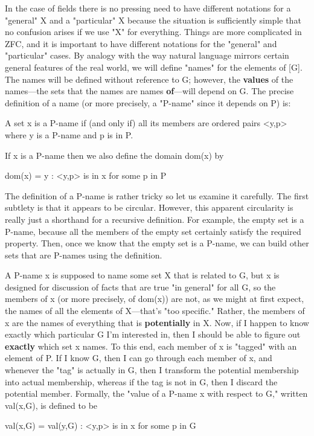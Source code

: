 \documentclass[10pt]{article}
\theoremstyle{definition}
\begin{document}
In the case of fields there is no pressing need to have different notations
for a "general" X and a "particular" X because the situation is sufficiently
simple that no confusion arises if we use "X" for everything.  Things are
more complicated in ZFC, and it is important to have different notations for
the "general" and "particular" cases.  By analogy with the way natural
language mirrors certain general features of the real world, we will define
"names" for the elements of [G].  The names will be defined without
reference to G; however, the \textbf{values} of the names---the sets that the names
are names \textbf{of}---will depend on G.  The precise definition of a name (or
more precisely, a "P-name" since it depends on P) is:

  A set x is a P-name if (and only if) all its members are
  ordered pairs <y,p> where y is a P-name and p is in P.

If x is a P-name then we also define the domain dom(x) by

  dom(x) = {y : <y,p> is in x for some p in P}

The definition of a P-name is rather tricky so let us examine it carefully.
The first subtlety is that it appears to be circular.  However, this
apparent circularity is really just a shorthand for a recursive definition.
For example, the empty set is a P-name, because all the members of the empty
set certainly satisfy the required property.  Then, once we know that the
empty set is a P-name, we can build other sets that are P-names using the
definition.

A P-name x is supposed to name some set X that is related to G, but x is
designed for discussion of facts that are true "in general" for all G, so
the members of x (or more precisely, of dom(x)) are not, as we might at
first expect, the names of all the elements of X---that's "too specific."
Rather, the members of x are the names of everything that is \textbf{potentially}
in X.  Now, if I happen to know exactly which particular G I'm interested
in, then I should be able to figure out \textbf{exactly} which set x names.  To
this end, each member of x is "tagged" with an element of P.  If I know G,
then I can go through each member of x, and whenever the "tag" is actually
in G, then I transform the potential membership into actual membership,
whereas if the tag is not in G, then I discard the potential member.
Formally, the "value of a P-name x with respect to G," written val(x,G), is
defined to be

  val(x,G) = {val(y,G) : <y,p> is in x for some p in G}
\end{document}
